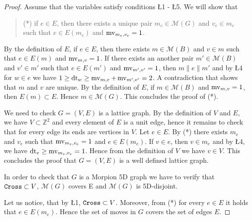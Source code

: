 \begin{proof}  
 Assume that the variables satisfy conditions \L{1} - \L{5}.
  We will show that
  \begin{quote}
  (*) if $e \in E$, then there exists a unique pair $m_e \in \mathcal{M}(G)$ and $v_e \in m_e$ such that $e \in E(m_e)$ and $\operatorname{mv}_{m_e, v_e} = 1$. 
  \end{quote}
  By the definition of $E$, if $e \in E$, then there exists $m \in \mathcal{M}(B)$ and $v \in m$ such that
    $e \in E(m)$ and $\operatorname{mv}_{m, v} = 1$. If there exists an another pair $m' \in \mathcal{M}(B)$ and $v' \in m'$ such 
    that $e \in E(m')$ and $\operatorname{mv}_{m', v'} = 1$, then $m \parallel e \parallel m'$ and by \L{4} for $w \in e$ we have
    $1 \geq \operatorname{dt}_w \geq \operatorname{mv}_{m, v} + \operatorname{mv}_{m', v'} = 2$. A contradiction that shows that $m$ and $v$ are unique.
  By the definition of $E$, if $m \in \mathcal{M}(B)$ and  $\operatorname{mv}_{m, v} = 1$, then $E(m) \subset E$. Hence
    $m \in \mathcal{M}(G)$.
  This concludes the proof of (*).

  We need to check $G = (V, E)$ is a lattice graph.
  By the definition of $V$ and $E$, we have $V \subset \mathbb{Z}^2$ and every element of $E$ is a unit edge, hence it remains 
to check that for every edge its ends are vertices in $V$.
  Let $e \in E$. By (*) there exists $m_e$ and $v_e$ such that $\operatorname{mv}_{m_e, v_e} = 1$ and $e \in E(m_e)$.
  If $v \in e$, then $v \in m_e$ and by \L{4}, we have $\operatorname{dt}_v \geq \operatorname{mv}_{m_e, v_e} = 1$. Hence from the definition of $V$ we have
$v \in V$. This concludes the proof that 
$G = (V, E)$ is a well defined lattice graph.
  
In order to check that $G$ is a Morpion 5D graph we have to verify that $\texttt{Cross} \subset V$, ${\mathcal M}(G)$ covers E
and ${\mathcal M}(G)$ is 5D-disjoint.

Let us notice, that by \L{1}, $\texttt{Cross} \subset V$. Moreover, from (*) for every $e \in E$ it holds that $e \in E(m_e)$. 
Hence the set of moves in $G$ covers the set of edges $E$.


\end{proof}

